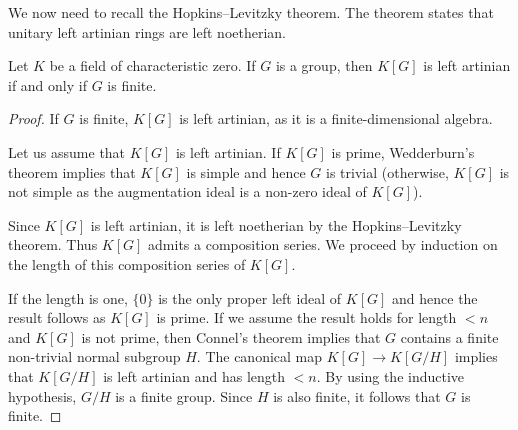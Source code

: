 \begin{graybox}
We now need to recall the Hopkins--Levitzky theorem. The theorem
states that unitary left artinian rings are left noetherian.

\begin{theorem}[Connel]
	Let $K$ be a field of characteristic zero. If $G$ is a group, then 
	$K[G]$ is left artinian if and only if $G$ is finite.
\end{theorem}

\begin{proof}
	If $G$ is finite, $K[G]$ is left artinian, as it is a finite-dimensional algebra.
	
	Let us assume that $K[G]$ is left artinian. 
	If $K[G]$ is prime, Wedderburn's theorem implies that 
	$K[G]$ is simple and hence 
	$G$ is trivial (otherwise, $K[G]$ is not simple as the augmentation ideal 
	is a non-zero ideal of $K[G]$).

	Since $K[G]$ is left artinian, it is left noetherian by the Hopkins--Levitzky theorem. Thus $K[G]$
	admits a composition series. We proceed by induction on the length of this composition series of 
	$K[G]$. 
	
	If the length is one, $\{0\}$ is the only proper left ideal of $K[G]$ and hence the result follows as 
	$K[G]$ is prime. If we assume the result holds for length $<n$ and $K[G]$ is not prime, then 
	Connel's theorem implies that $G$ contains a finite non-trivial normal subgroup $H$. The canonical map
	$K[G]\to K[G/H]$ implies that $K[G/H]$ is left artinian and has length 
	$<n$. By using the inductive hypothesis, $G/H$
	is a finite group. Since $H$ is also finite, it follows that $G$ is finite. 
\end{proof}
\end{graybox}


